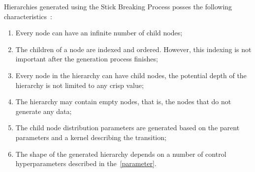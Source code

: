 \documentclass{article}
\begin{document}
    Hierarchies generated using the Stick Breaking Process posses the following characteristics~\cite{ghahramani2010tree, Spytkowski2012}:
\begin{enumerate}
    \item Every node can have an infinite number of child nodes;
    \item The children of a node are indexed and ordered. However, this indexing is not important after the generation process finishes;
    \item Every node in the hierarchy can have child nodes, the potential depth of the hierarchy is not limited to any crisp value;
    \item The hierarchy may contain empty nodes, that is, the nodes that do not generate any data;
    \item The child node distribution parameters are generated based on the parent parameters and a kernel describing the transition;
    \item The shape of the generated hierarchy depends on a number of control hyperparameters described in the~\cref{parameter}.
\end{enumerate}
    
\end{document}
